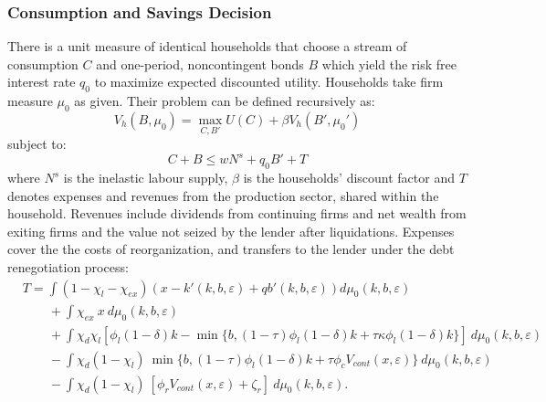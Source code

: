 \documentclass[12pt]{article}
\begin{document}
\subsubsection{Consumption and Savings Decision} \label{sec:Cons and Savings decision}
There is a unit measure of identical households that choose a stream of consumption $C$ and one-period, noncontingent bonds $B$ which yield the risk free interest rate $q_0$ to maximize expected discounted utility. Households take firm measure $\mu_0$ as given. Their problem can be defined recursively as: 
\begin{equation} \label{eq:U_max}
V_h(B, \mu_0) = \max_{C,B'} U(C) + \beta V_h(B',\mu_0')
\end{equation}  
subject to: 
\begin{equation} \label{eq:const_hh}
C + B \leq w N^s + q_0 B' + T
\end{equation} 
where $N^s$ is the inelastic labour supply, $\beta$ is the households' discount factor and $T$ denotes expenses and revenues from the production sector, shared within the household. Revenues include dividends from continuing firms and net wealth from exiting firms and the value not seized by the lender after liquidations. Expenses cover the the costs of reorganization, and transfers to the lender under the debt renegotiation process:
\begin{equation*} \label{eq:T}
    \begin{split}
        & T = \int (1 - \chi_l - \chi_{ex}) \left( x - k'(k,b,\varepsilon) + qb'(k,b,\varepsilon) \right) d \mu_0(k,b,\varepsilon) \\
        & \qquad + \int \chi_{ex} \ x \ d \mu_0(k,b,\varepsilon) \\
        & \qquad + \int \chi_d \chi_{l} [ \phi_l (1-\delta) k -  \min\{b, (1-\tau) \phi_l (1-\delta) k +\tau \kappa \phi_l  (1-\delta) k \} ] \ d \mu_0(k,b,\varepsilon)  \\
        & \qquad  - \int \chi_d (1-\chi_{l}) \ \min\{b, (1-\tau) \phi_l (1-\delta) k +\tau \phi_c V_{cont} (x, \varepsilon)        \} \ d \mu_0(k,b,\varepsilon) \\
        & \qquad  - \int \chi_d (1-\chi_{l}) \  [ \phi_r V_{cont} (x, \varepsilon) + \zeta_r] \ d \mu_0(k,b,\varepsilon).
    \end{split}
\end{equation*}
\end{document}
